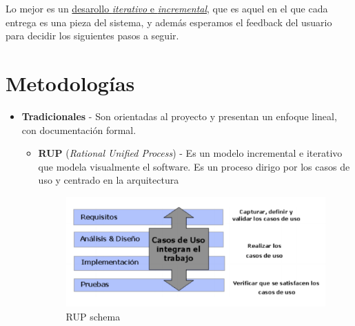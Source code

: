 Lo mejor es un \ul{desarollo \textit{iterativo} e \textit{incremental}}, que es aquel en el que cada entrega es una pieza del sistema, y además esperamos el feedback del usuario para decidir los siguientes pasos a seguir.

\section{Metodologías}

\begin{itemize}
   \item \textbf{Tradicionales} - Son orientadas al proyecto y presentan un enfoque lineal, con documentación formal.
   \begin{itemize}
   \item \textbf{RUP} (\textit{Rational Unified Process}) - Es un modelo incremental e iterativo que modela visualmente el software. Es un proceso dirigo por los casos de uso y centrado en la arquitectura\\
   \begin{figure}[htbp]
      \centering
      \includegraphics{images/07/rup.png}
      \caption{RUP schema}
      \label{fig:07/rup}
   \end{figure}


\end{itemize}
\end{itemize}
